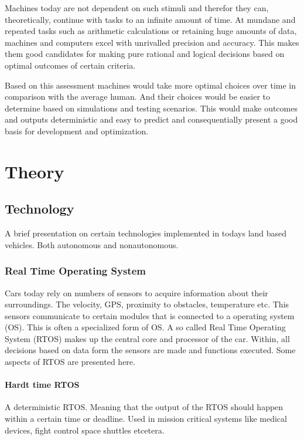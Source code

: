 \documentclass[conference]{IEEEtran}
\begin{document}
		 Machines today are not dependent on such stimuli and therefor they can, theoretically, continue with tasks to an
		 infinite amount of time. At mundane and repeated tasks such as arithmetic calculations or retaining huge amounts of data,
		 machines and computers excel with unrivalled precision and accuracy. This makes them good candidates for making
		 pure rational and logical decisions based on optimal outcomes of certain criteria.

		 Based on this assessment machines would take more optimal choices over time in comparison with the average human.
		 And their choices would be easier to determine based on simulations and testing scenarios.
		 This would make outcomes and outputs deterministic and easy to predict and consequentially present a good
		 basis for development and optimization.

\section{Theory}
 \subsection{Technology}
	 A brief presentation on certain technologies implemented in todays land based vehicles. Both autonomous
	 and nonautonomous.
	 \subsubsection{Real Time Operating System}
		 Cars today rely on numbers of sensors to acquire information about their surroundings.
		 The velocity, GPS, proximity to obstacles, temperature etc. This sensors communicate to certain
		 modules that is connected to a operating system (OS). This is often a specialized form
		 of OS. A so called Real Time Operating System (RTOS) makes up the central core and processor
		 of the car. Within, all decisions based on data form the sensors are made and functions
		 executed. Some aspects of RTOS are presented here.\cite{Wiki:RTOS}

		 \paragraph{Hardt time RTOS}
		 A deterministic RTOS. Meaning that the output of the RTOS should happen within a certain
		 time or deadline. Used in mission critical systems like medical devices, fight control
		 space shuttles etcetera.
\end{document}
